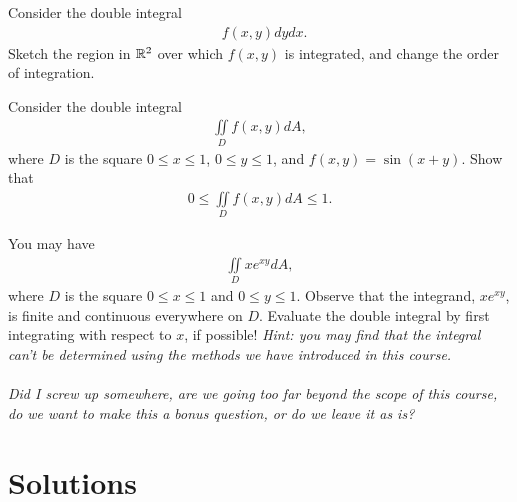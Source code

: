 \documentclass{article}
\begin{document}
Consider the double integral
\begin{align*}
  \mathop{\int_{0}^{1+e} \! \int_0^{\ln(x-1)}} f(x,y) dydx .
\end{align*}
Sketch the region in $\mathbb{R}^2$ over which $f(x,y)$ is integrated, and change the order of integration.  
\item %
Consider the double integral
\begin{align*}
  \iint\limits_D f(x,y) dA,
\end{align*}
where $D$ is the square $0\le x \le 1$, $0\le y \le 1$, and $f(x,y) = \sin(x+y)$. Show that 
\begin{align*}
  0 \le \iint\limits_D f(x,y) dA \le 1.
\end{align*}
\item %
You may have 
\begin{align*}
  \iint\limits_D xe^{xy}dA,
 \end{align*}
where $D$ is the square $0\le x\le 1$ and $0\le y \le 1$. Observe that the integrand, $xe^{xy}$, is finite and continuous everywhere on $D$. Evaluate the double integral by first integrating with respect to $x$, if possible! \textit{Hint: you may find that the integral can't be determined using the methods we have introduced in this course.}  \\ \\ \textit{Did I screw up somewhere, are we going too far beyond the scope of this course, do we want to make this a bonus question, or do we leave it as is?}


\EEN %

%
%
% 

\newpage
\section*{Solutions}
\end{document}
